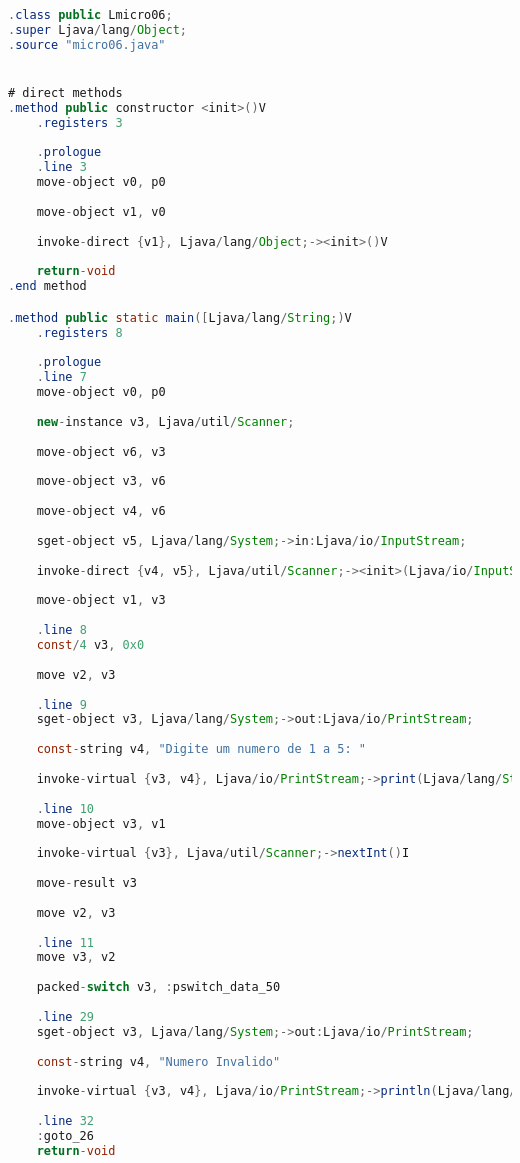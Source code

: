 \documentclass[hidelinks,12pt]{article}
\begin{document}
	\begin{lstlisting}[caption=Smali resultante do .java,language=java]
.class public Lmicro06;
.super Ljava/lang/Object;
.source "micro06.java"


# direct methods
.method public constructor <init>()V
	.registers 3
	
	.prologue
	.line 3
	move-object v0, p0
	
	move-object v1, v0
	
	invoke-direct {v1}, Ljava/lang/Object;-><init>()V
	
	return-void
.end method

.method public static main([Ljava/lang/String;)V
	.registers 8
	
	.prologue
	.line 7
	move-object v0, p0
	
	new-instance v3, Ljava/util/Scanner;
	
	move-object v6, v3
	
	move-object v3, v6
	
	move-object v4, v6
	
	sget-object v5, Ljava/lang/System;->in:Ljava/io/InputStream;
	
	invoke-direct {v4, v5}, Ljava/util/Scanner;-><init>(Ljava/io/InputStream;)V
	
	move-object v1, v3
	
	.line 8
	const/4 v3, 0x0
	
	move v2, v3
	
	.line 9
	sget-object v3, Ljava/lang/System;->out:Ljava/io/PrintStream;
	
	const-string v4, "Digite um numero de 1 a 5: "
	
	invoke-virtual {v3, v4}, Ljava/io/PrintStream;->print(Ljava/lang/String;)V
	
	.line 10
	move-object v3, v1
	
	invoke-virtual {v3}, Ljava/util/Scanner;->nextInt()I
	
	move-result v3
	
	move v2, v3
	
	.line 11
	move v3, v2
	
	packed-switch v3, :pswitch_data_50
	
	.line 29
	sget-object v3, Ljava/lang/System;->out:Ljava/io/PrintStream;
	
	const-string v4, "Numero Invalido"
	
	invoke-virtual {v3, v4}, Ljava/io/PrintStream;->println(Ljava/lang/String;)V
	
	.line 32
	:goto_26
	return-void
	

\end{lstlisting}
\end{document}

